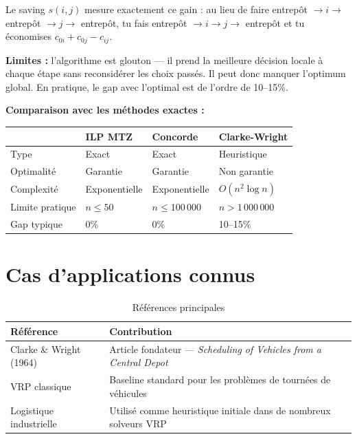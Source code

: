 \documentclass[12pt, a4paper]{article}
\begin{document}
Le saving $s(i,j)$ mesure exactement ce gain : au lieu de faire
entrepôt $\to i \to$ entrepôt $\to j \to$ entrepôt, tu fais
entrepôt $\to i \to j \to$ entrepôt et tu économises $c_{0i} + c_{0j} - c_{ij}$.

\medskip
\textbf{Limites :} l'algorithme est glouton --- il prend la meilleure décision
locale à chaque étape sans reconsidérer les choix passés.
Il peut donc manquer l'optimum global.
En pratique, le gap avec l'optimal est de l'ordre de 10--15\%.

\medskip
\textbf{Comparaison avec les méthodes exactes :}

\begin{center}
\begin{tabular}{llll}
  \toprule
  & \textbf{ILP MTZ} & \textbf{Concorde} & \textbf{Clarke-Wright} \\
  \midrule
  Type           & Exact      & Exact       & Heuristique \\
  Optimalité     & Garantie   & Garantie    & Non garantie \\
  Complexité     & Exponentielle & Exponentielle & $O(n^2 \log n)$ \\
  Limite pratique & $n \leq 50$ & $n \leq 100\,000$ & $n > 1\,000\,000$ \\
  Gap typique    & 0\%        & 0\%         & 10--15\% \\
  \bottomrule
\end{tabular}
\end{center}

\section{Cas d'applications connus}

\begin{table}[h]
  \centering
  \begin{tabular}{ll}
    \toprule
    \textbf{Référence} & \textbf{Contribution} \\
    \midrule
    Clarke \& Wright (1964) & Article fondateur --- \textit{Scheduling of Vehicles from a Central Depot} \\
    VRP classique           & Baseline standard pour les problèmes de tournées de véhicules \\
    Logistique industrielle & Utilisé comme heuristique initiale dans de nombreux solveurs VRP \\
    \bottomrule
  \end{tabular}
  \caption{Références principales}
\end{table}
\end{document}
